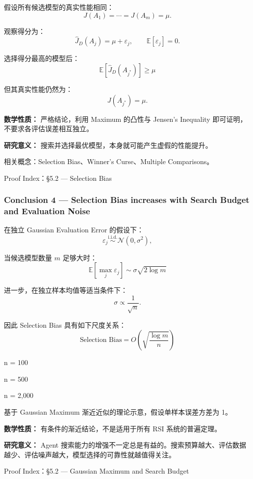 假设所有候选模型的真实性能相同：
\[J(A_1)=\cdots=J(A_m)=\mu.\]

观察得分为：
\[\widehat J_D(A_j)=\mu+\varepsilon_j,
\qquad
\mathbb E[\varepsilon_j]=0.\]

选择得分最高的模型后：
\[\boxed{
\mathbb E[\widehat J_D(A_{j^*})]
\geq\mu
}\]

但其真实性能仍然为：
\[J(A_{j^*})=\mu.\]

\textbf{数学性质：} 严格结论，利用 Maximum 的凸性与 Jensen's Inequality 即可证明，不要求各评估误差相互独立。

\textbf{研究意义：} 搜索并选择最优模型，本身就可能产生虚假的性能提升。

相关概念：Selection Bias、Winner's Curse、Multiple Comparisons。

Proof Index：§5.2 --- Selection Bias

\hypertarget{part-1-10-0001-conclusion-4-selection-bias-increases-with-search-budget-and-evaluation-noise}{%
\subsubsection{Conclusion 4 --- Selection Bias increases with Search Budget and Evaluation Noise}\label{part-1-10-0001-conclusion-4-selection-bias-increases-with-search-budget-and-evaluation-noise}}

在独立 Gaussian Evaluation Error 的假设下：
\[\varepsilon_j
\overset{\mathrm{i.i.d.}}{\sim}
\mathcal N(0,\sigma^2),\]

当候选模型数量 \(m\) 足够大时：
\[\boxed{
\mathbb E[\max_j\varepsilon_j]
\sim
\sigma\sqrt{2\log m}
}\]

进一步，在独立样本均值等适当条件下：
\[\sigma\propto\frac1{\sqrt n}.\]

因此 Selection Bias 具有如下尺度关系：
\[\boxed{
\text{Selection Bias}
=
O\left(\sqrt{\frac{\log m}{n}}\right)
}\]


n = 100

n = 500

n = 2,000

基于 Gaussian Maximum 渐近近似的理论示意，假设单样本误差方差为 1。

\textbf{数学性质：} 有条件的渐近结论，不是适用于所有 RSI 系统的普遍定理。

\textbf{研究意义：} Agent 搜索能力的增强不一定总是有益的。搜索预算越大、评估数据越少、评估噪声越大，模型选择的可靠性就越值得关注。

Proof Index：§5.2 --- Gaussian Maximum and Search Budget


